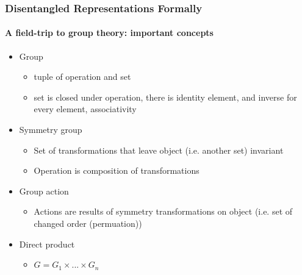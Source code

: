 \documentclass[9pt]{beamer}
\begin{document}
\begin{frame}
\frametitle{Disentangled Representations Formally}
\framesubtitle{A field-trip to group theory: important concepts}
\begin{itemize}%
	\item Group
	\begin{itemize}
		\item tuple of operation and set
		\item set is closed under operation, there is identity element, and inverse for every element, associativity
	\end{itemize}
	\item Symmetry group
	\begin{itemize}
		\item Set of transformations that leave object (i.e. another set) invariant
		\item Operation is composition of transformations
	\end{itemize}
	\item Group action
	\begin{itemize}
		\item Actions are results of symmetry transformations on object (i.e. set of changed order (permuation))
	\end{itemize}
	\item Direct product
	\begin{itemize}
		\item $G = G_1 \times ... \times G_n$
	\end{itemize}
 \end{itemize}
\end{frame} 
\end{document}
